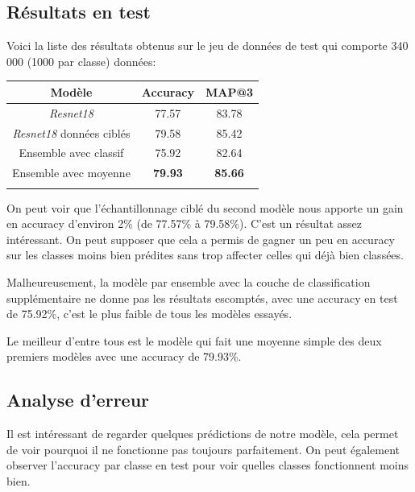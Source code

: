 
\subsection{Résultats en test}

Voici la liste des résultats obtenus sur le jeu de données de test qui comporte 340 000 (1000 par classe) données:

\begin{center}
\setlength{\tabcolsep}{5mm}
\begin{tabular}{c c c}
\toprule
\textbf{Modèle} & \textbf{Accuracy} & \textbf{MAP@3}  \\



\midrule

\textit{Resnet18} & 77.57&83.78 \\
\textit{Resnet18} données ciblés  &79.58&85.42 \\
Ensemble avec classif  & 75.92 &82.64       \\
Ensemble avec moyenne     & \textbf{79.93}&\textbf{85.66}        \\



\bottomrule
\addlinespace[3mm]
\end{tabular}
\end{center}

On peut voir que l'échantillonnage ciblé du second modèle nous apporte un gain en accuracy d'environ 2\% (de 77.57\% à 79.58\%). C'est un résultat assez intéressant. On peut supposer que cela a permis de gagner un peu en accuracy sur les classes moins bien prédites sans trop affecter celles qui déjà bien classées.


Malheureusement, la modèle par ensemble avec la couche de classification supplémentaire ne donne pas les résultats escomptés, avec une accuracy en test de 75.92\%, c'est le plus faible de tous les modèles essayés.


Le meilleur d'entre tous est le modèle qui fait une moyenne simple des deux premiers modèles avec une accuracy de 79.93\%.


\subsection{Analyse d'erreur}
Il est intéressant de regarder quelques prédictions de notre modèle, cela permet de voir pourquoi il ne fonctionne pas toujours parfaitement. On peut également observer l'accuracy par classe en test pour voir quelles classes fonctionnent moins bien.


